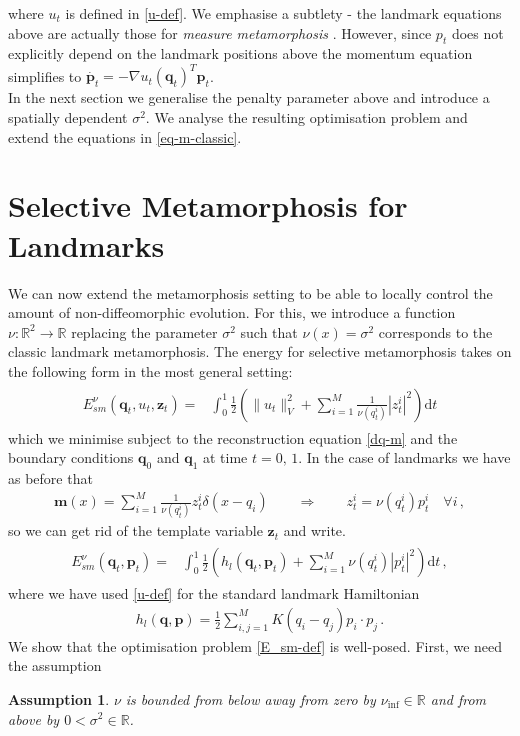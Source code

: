 \documentclass[runningheads]{llncs}
\newcommand{\half}{\frac 12}
\newcommand{\norm}[2]{\| #1 \|_{ #2 }}
\newcommand{\vnorm}[1]{\norm{ #1 }{V}}
\newcommand{\diff}[1]{\text{d} #1}
\newcommand{\nuinf}{\nu_\text{inf}}
\newtheorem{assumption}{Assumption}
\begin{document}
where $u_t$ is defined in \eqref{u-def}. We emphasise a subtlety - the landmark
equations above are actually those for \emph{measure metamorphosis}
\cite[Section 11.1, equation 33]{holm2009euler}. However, since $p_t$ does not
explicitly depend on the landmark positions above the momentum equation
simplifies to $\dot{\mathbf p_t} = - \nabla u_t(\mathbf q_t)^T \mathbf p_t$.\\

In the next section we generalise the penalty parameter above and introduce a
spatially dependent $\sigma^2$. We analyse the resulting optimisation problem
and extend the equations in \eqref{eq-m-classic}.

\section{Selective Metamorphosis for Landmarks}\label{sec:select_mm}

We can now extend the metamorphosis setting to be able to locally control the
amount of non-diffeomorphic evolution.  For this, we introduce a function $\nu:
\mathbb R^2\to \mathbb R$ replacing the parameter $\sigma^2$ such that
$\nu(x)=\sigma^2$ corresponds to the classic landmark metamorphosis. The energy
for selective metamorphosis takes on the following form in the most general
setting:
\begin{align}
  \begin{split}
    E_{sm}^\nu(\mathbf q_t, u_t, \mathbf z_t) = & \int_0^1
    \half  \left (\vnorm{u_t}^2 +\sum_{i=1}^M \frac{1}{\nu(q_t^i)}|z_t^i|^2\right )\diff{t}
  \end{split}
  \label{E_sm-def}
\end{align}
which we minimise subject to the reconstruction equation \eqref{dq-m} and the
boundary conditions $\mathbf q_0$ and $\mathbf q_1$ at time $t=0,\,1$. In the
case of landmarks we have as before that
\begin{align}\label{zp_relation}
  \mathbf m(x) = \sum_{i=1}^M \frac{1}{\nu(q_t^i)} z_t^i\delta(x-q_i)\qquad \Rightarrow \qquad
  z_t^i = \nu(q_t^i) p_t^i\quad \forall i\, , 
\end{align}
so we can get rid of the template variable $\mathbf z_t$ and write. 
\begin{align}
  \begin{split}
    E_{sm}^\nu(\mathbf q_t, \mathbf p_t) = & \int_0^1
    \half  \left (h_l(\mathbf q_t,\mathbf p_t)  +\sum_{i=1}^M \nu(q_t^i)|p_t^i|^2\right )\diff{t}\, , 
  \end{split}
  \label{E_sm-def_p}
\end{align}
where we have used \eqref{u-def} for the standard landmark Hamiltonian
\begin{align}
  h_l(\mathbf q, \mathbf p) =  \frac12 \sum_{i,j=1}^M K(q_i-q_j)p_i\cdot p_j\, . 
\label{hamiltonian}
\end{align}
We show that the optimisation problem \eqref{E_sm-def} is well-posed. First, we
need the assumption
\begin{assumption}\label{assumption:nu_bounded}
$\nu$ is bounded from below away from zero by $\nuinf \in \mathbb R$ and from
above by $0<\sigma^2\in\mathbb R$.
\end{assumption}
\end{document}
